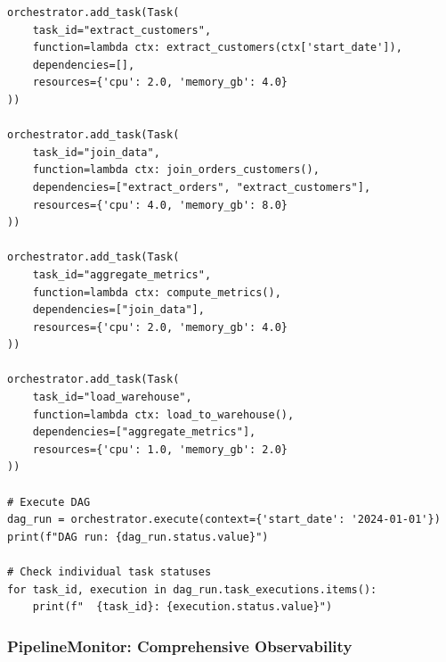\begin{lstlisting}[style=python, caption=PipelineOrchestrator with Dependency Management]
orchestrator.add_task(Task(
    task_id="extract_customers",
    function=lambda ctx: extract_customers(ctx['start_date']),
    dependencies=[],
    resources={'cpu': 2.0, 'memory_gb': 4.0}
))

orchestrator.add_task(Task(
    task_id="join_data",
    function=lambda ctx: join_orders_customers(),
    dependencies=["extract_orders", "extract_customers"],
    resources={'cpu': 4.0, 'memory_gb': 8.0}
))

orchestrator.add_task(Task(
    task_id="aggregate_metrics",
    function=lambda ctx: compute_metrics(),
    dependencies=["join_data"],
    resources={'cpu': 2.0, 'memory_gb': 4.0}
))

orchestrator.add_task(Task(
    task_id="load_warehouse",
    function=lambda ctx: load_to_warehouse(),
    dependencies=["aggregate_metrics"],
    resources={'cpu': 1.0, 'memory_gb': 2.0}
))

# Execute DAG
dag_run = orchestrator.execute(context={'start_date': '2024-01-01'})
print(f"DAG run: {dag_run.status.value}")

# Check individual task statuses
for task_id, execution in dag_run.task_executions.items():
    print(f"  {task_id}: {execution.status.value}")
\end{lstlisting}

\subsubsection{PipelineMonitor: Comprehensive Observability}

